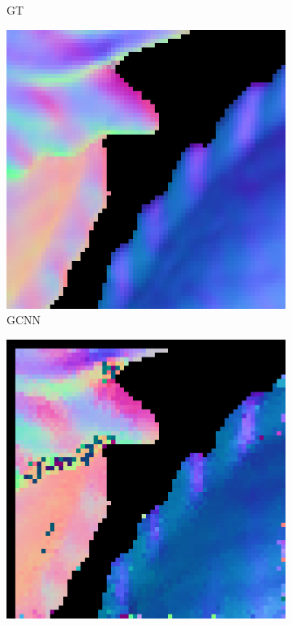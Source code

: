 \documentclass[border=15pt, multi, tikz]{article}
\begin{document}
\begin{figure}[th]
\begin{subfigure}[b]{0.15\linewidth}
		\caption{GT}
	\end{subfigure}
	\begin{subfigure}[b]{0.15\linewidth}
		\includegraphics[width=\linewidth]{./Figures/comparison/eval_2_normal_GCNN.png}
		\caption{GCNN}
	\end{subfigure}
	\begin{subfigure}[b]{0.15\linewidth}
		\includegraphics[width=\linewidth]{./Figures/comparison/eval_2_normal_SVD.png}

\end{subfigure}
\end{figure}
\end{document}
